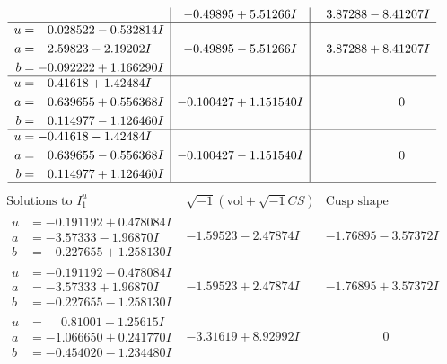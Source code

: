 \documentclass[1p]{elsarticle_modified}
\theoremstyle{definition}
\newcommand{\I}{\sqrt{-1}}
\begin{document}
$$\begin{array}{c|c|c}
 & -0.49895 + 5.51266 I & \phantom{-}3.87288 - 8.41207 I \\ \hline\begin{aligned}
u &= \phantom{-}0.028522 - 0.532814 I \\
a &= \phantom{-}2.59823 - 2.19202 I \\
b &= -0.092222 + 1.166290 I\end{aligned}
 & -0.49895 - 5.51266 I & \phantom{-}3.87288 + 8.41207 I \\ \hline\begin{aligned}
u &= -0.41618 + 1.42484 I \\
a &= \phantom{-}0.639655 + 0.556368 I \\
b &= \phantom{-}0.114977 - 1.126460 I\end{aligned}
 & -0.100427 + 1.151540 I & \phantom{-0.000000 } 0 \\ \hline\begin{aligned}
u &= -0.41618 - 1.42484 I \\
a &= \phantom{-}0.639655 - 0.556368 I \\
b &= \phantom{-}0.114977 + 1.126460 I\end{aligned}
 & -0.100427 - 1.151540 I & \phantom{-0.000000 } 0\\
 \hline 
 \end{array}$$\newpage$$\begin{array}{c|c|c}  
\text{Solutions to }I^u_{1}& \I (\text{vol} + \sqrt{-1}CS) & \text{Cusp shape}\\
 \hline 
\begin{aligned}
u &= -0.191192 + 0.478084 I \\
a &= -3.57333 - 1.96870 I \\
b &= -0.227655 + 1.258130 I\end{aligned}
 & -1.59523 - 2.47874 I & -1.76895 - 3.57372 I \\ \hline\begin{aligned}
u &= -0.191192 - 0.478084 I \\
a &= -3.57333 + 1.96870 I \\
b &= -0.227655 - 1.258130 I\end{aligned}
 & -1.59523 + 2.47874 I & -1.76895 + 3.57372 I \\ \hline\begin{aligned}
u &= \phantom{-}0.81001 + 1.25615 I \\
a &= -1.066650 + 0.241770 I \\
b &= -0.454020 - 1.234480 I\end{aligned}
 & -3.31619 + 8.92992 I & \phantom{-0.000000 } 0 \\ \hline\begin{aligned}

\end{aligned}
\end{array}$$
\end{document}
